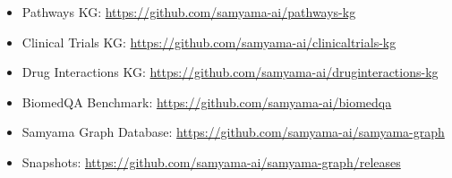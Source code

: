 \documentclass[11pt]{article}
\begin{document}
\begin{itemize}[leftmargin=*]
  \item Pathways KG: \url{https://github.com/samyama-ai/pathways-kg}
  \item Clinical Trials KG: \url{https://github.com/samyama-ai/clinicaltrials-kg}
  \item Drug Interactions KG: \url{https://github.com/samyama-ai/druginteractions-kg}
  \item BiomedQA Benchmark: \url{https://github.com/samyama-ai/biomedqa}
  \item Samyama Graph Database: \url{https://github.com/samyama-ai/samyama-graph}
  \item Snapshots: \url{https://github.com/samyama-ai/samyama-graph/releases}
\end{itemize}



\end{document}
